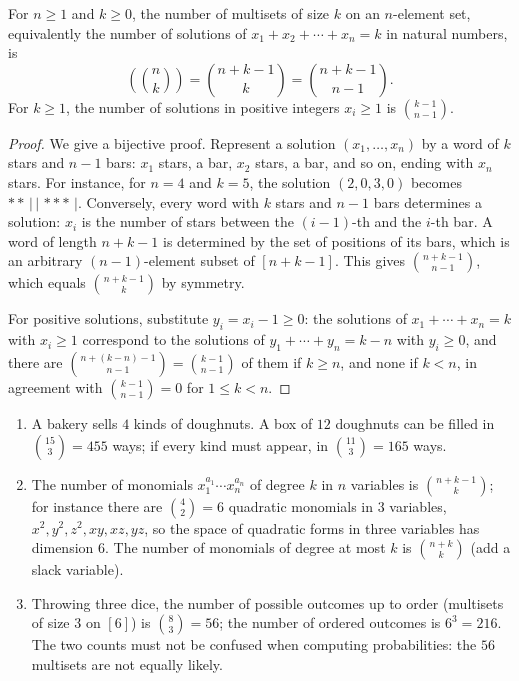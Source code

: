 \begin{theorem}\label{combinatorics:theorem-stars-bars}
For $n \geq 1$ and $k \geq 0$, the number of multisets of size $k$ on an $n$-element set, equivalently the number of solutions of $x_1 + x_2 + \cdots + x_n = k$ in natural numbers, is
\[
\left(\!\binom{n}{k}\!\right) = \binom{n + k - 1}{k} = \binom{n + k - 1}{n - 1}.
\]
For $k \geq 1$, the number of solutions in positive integers $x_i \geq 1$ is $\binom{k - 1}{n - 1}$.
\end{theorem}

\begin{proof}
We give a bijective proof. Represent a solution $(x_1, \ldots, x_n)$ by a word of $k$ stars and $n - 1$ bars: $x_1$ stars, a bar, $x_2$ stars, a bar, and so on, ending with $x_n$ stars. For instance,
for $n = 4$ and $k = 5$, the solution $(2, 0, 3, 0)$ becomes $\ast\ast\,|\,|\,\ast\ast\ast\,|$. Conversely, every word with $k$ stars and $n - 1$ bars determines a solution: $x_i$ is the number of stars
between the $(i - 1)$-th and the $i$-th bar. A word of length $n + k - 1$ is determined by the set of positions of its bars, which is an arbitrary $(n - 1)$-element subset of $[n + k - 1]$. This gives
$\binom{n + k - 1}{n - 1}$, which equals $\binom{n + k - 1}{k}$ by symmetry.

For positive solutions, substitute $y_i = x_i - 1 \geq 0$: the solutions of $x_1 + \cdots + x_n = k$ with $x_i \geq 1$ correspond to the solutions of $y_1 + \cdots + y_n = k - n$ with $y_i \geq 0$, and
there are $\binom{n + (k - n) - 1}{n - 1} = \binom{k - 1}{n - 1}$ of them if $k \geq n$, and none if $k < n$, in agreement with $\binom{k-1}{n-1} = 0$ for $1 \leq k < n$.
\end{proof}

\begin{example}\label{combinatorics:example-stars-bars}
\begin{enumerate}
\item A bakery sells $4$ kinds of doughnuts. A box of $12$ doughnuts can be filled in $\binom{15}{3} = 455$ ways; if every kind must appear, in $\binom{11}{3} = 165$ ways.
\item The number of monomials $x_1^{a_1} \cdots x_n^{a_n}$ of degree $k$ in $n$ variables is $\binom{n + k - 1}{k}$; for instance there are $\binom{4}{2} = 6$ quadratic monomials in $3$ variables,
$x^2, y^2, z^2, xy, xz, yz$, so the space of quadratic forms in three variables has dimension $6$. The number of monomials of degree at most $k$ is $\binom{n + k}{k}$ (add a slack variable).
\item Throwing three dice, the number of possible outcomes up to order (multisets of size $3$ on $[6]$) is $\binom{8}{3} = 56$; the number of ordered outcomes is $6^3 = 216$. The two counts must not be
confused when computing probabilities: the $56$ multisets are not equally likely.
\end{enumerate}
\end{example}

